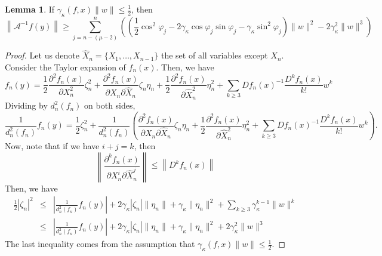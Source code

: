 \documentclass[12pt,oneside,reqno]{amsart}
\theoremstyle{definition}
\newtheorem{lem}[thm]{Lemma}
\begin{document}
\begin{lem}\label{lem:inverseOperatorLowerbound}
	If $\gamma_\kappa(f,x)\|w\|\leq \frac{1}{2}$, then 
	\[\left\|\mathcal{A}^{-1}f(y)\right\|\geq \sum\limits_{j=n-(\mu-2)}^n\left(\left(\frac{1}{2}\cos^2\varphi_{j}-2\gamma_{\kappa}\cos\varphi_j\sin\varphi_j-\gamma_{\kappa}\sin^2\varphi_j\right)\|w\|^2 -2\gamma_{\kappa}^2\|w\|^3\right)\]
\end{lem}
\begin{proof}
	Let us denote $\hat{X}_n=\{X_1,\dots, X_{n-1}\}$ the set of all variables except $X_n$. Consider the Taylor expansion of $f_{n}(x)$. Then, we have
	{\footnotesize	\[f_{n}(y)=\frac{1}{2}\frac{\partial^2 f_{n}(x)}{\partial X_{n}^2}\zeta_{n}^2+\frac{\partial^2 f_{n}(x)}{\partial X_{n}\partial \hat{X}_n}\zeta_{n}\eta_n+\frac{1}{2}\frac{\partial^2 f_{n}(x)}{\partial\hat{X}_n^2}\eta_n^2 +\sum\limits_{k\geq 3}Df_{n}(x)^{-1}\frac{D^kf_{n}(x)}{k!}w^k\]}
	Dividing by $d_{n}^2(f_{n})$ on both sides,
	{\footnotesize \[\frac{1}{d_{n}^2(f_{n})}f_{n}(y)=\frac{1}{2}\zeta_{n}^2+\frac{1}{d_{n}^2(f_{n})}\left(\frac{\partial^2 f_{n}(x)}{\partial X_{n}\partial \hat{X}_n}\zeta_{n}\eta_n+\frac{1}{2}\frac{\partial^2 f_{n}(x)}{\partial\hat{X}_n^2}\eta_n^2 +\sum\limits_{k\geq 3}Df_{n}(x)^{-1}\frac{D^k\hat{f}_{n}(x)}{k!}w^k\right).\]}
	Now, note that if we have $i+j=k$, then
	{\footnotesize\[\left\|\frac{\partial^k f_{n}(x)}{\partial X_{n}^i\partial \hat{X}_n^j}\right\|\leq \left\|D^k f_{n}(x)\right\|\]}
	Then, we have
	{\footnotesize
		\begin{eqnarray*}
			\frac{1}{2}\left|\zeta_{n}\right|^2 &\leq & \left|\frac{1}{d_{n}^2(f_{n})}f_{n}(y)\right| + 2\gamma_\kappa|\zeta_{n}|\|\eta_n\|+\gamma_\kappa\|\eta_n\|^2 +\sum\limits_{k\geq 3}\gamma_\kappa^{k-1}\|w\|^k\\
			&\leq & \left|\frac{1}{d_{n}^2(f_{n})}f_{n}(y)\right| + 2\gamma_\kappa|\zeta_{n}|\|\eta_n\|+\gamma_\kappa\|\eta_n\|^2 +2\gamma_\kappa^{2}\|w\|^3
		\end{eqnarray*}
	}
	The last inequality comes from the assumption that $\gamma_\kappa(f,x)\|w\|\leq \frac{1}{2}$.
	

\end{proof}
\end{document}
